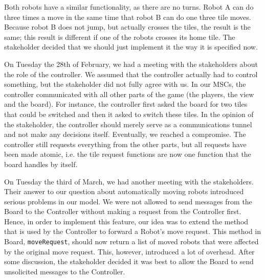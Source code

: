 \bigskip
Both robots have a similar functionality, as there are no turns. Robot A can do three times a move in the same time that robot B can do one three tile moves. Because robot B does not jump, but actually crosses the tiles, the result is the same; this result is different if one of the robots crosses its home tile. The stakeholder decided that we should just implement it the way it is specified now.

On Tuesday the 28th of February, we had a meeting with the stakeholders about the role of the controller. We assumed that the controller actually had to control something, but the stakeholder did not fully agree with us. In our MSCs, the controller communicated with all other parts of the game (the players, the view and the board). For instance, the controller first asked the board for two tiles that could be switched and then it asked to switch these tiles. In the opinion of the stakeholder, the controller should merely serve as a communications tunnel and not make any decisions itself. Eventually, we reached a compromise. The controller still requests everything from the other parts, but all requests have been made atomic, i.e. the tile request functions are now one function that the board handles by itself.

On Tuesday the third of March, we had another meeting with the stakeholders. Their answer to our question about automatically moving robots introduced serious problems in our model. We were not allowed to send messages from the Board to the Controller without making a request from the Controller first. Hence, in order to implement this feature, our idea was to extend the method that is used by the Controller to forward a Robot's move request. This method in Board, \texttt{moveRequest}, should now return a list of moved robots that were affected by the original move request. This, however, introduced a lot of overhead. After some discussion, the stakeholder decided it was best to allow the Board to send unsolicited messages to the Controller.
